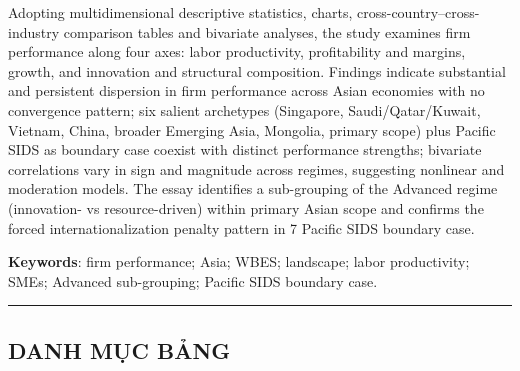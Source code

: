 \documentclass[
  a4paper,
  13pt]{extreport}
\begin{document}
Adopting multidimensional descriptive statistics, charts,
cross-country--cross-industry comparison tables and bivariate analyses,
the study examines firm performance along four axes: labor productivity,
profitability and margins, growth, and innovation and structural
composition. Findings indicate substantial and persistent dispersion in
firm performance across Asian economies with no convergence pattern; six
salient archetypes (Singapore, Saudi/Qatar/Kuwait, Vietnam, China,
broader Emerging Asia, Mongolia, primary scope) plus Pacific SIDS as
boundary case coexist with distinct performance strengths; bivariate
correlations vary in sign and magnitude across regimes, suggesting
nonlinear and moderation models. The essay identifies a sub-grouping of
the Advanced regime (innovation- vs resource-driven) within primary
Asian scope and confirms the forced internationalization penalty pattern
in 7 Pacific SIDS boundary case.

\textbf{Keywords}: firm performance; Asia; WBES; landscape; labor
productivity; SMEs; Advanced sub-grouping; Pacific SIDS boundary case.

\begin{center}\rule{0.5\linewidth}{0.5pt}\end{center}

\renewcommand{\contentsname}{MỤC LỤC}
\setcounter{tocdepth}{3}
\tableofcontents

\hypertarget{danh-mux1ee5c-bux1ea3ng}{%
\subsection{DANH MỤC BẢNG}\label{danh-mux1ee5c-bux1ea3ng}}
\end{document}
